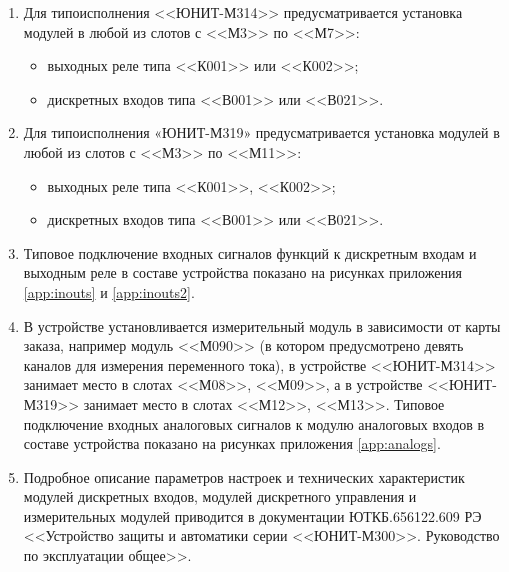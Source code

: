 \documentclass[a4paper, 12pt,table, hidelinks, DIV=calc]{extarticle} %
\begin{document}
\begin{enumerate}[label=\arabic{section}.\arabic{subsection}.\arabic*, labelsep=4pt, leftmargin=0pt, itemindent=57pt]
\item
Для типоисполнения <<ЮНИТ-М314>> предусматривается установка модулей в любой из слотов с <<М3>> по <<М7>>:
\begin{itemize}
    \item выходных реле типа <<К001>> или <<К002>>;
    \item дискретных входов типа <<В001>> или <<В021>>.
\end{itemize}
\item
Для типоисполнения «ЮНИТ-М319» предусматривается установка модулей в любой из слотов с <<М3>> по <<М11>>:
\begin{itemize}
    \item выходных реле типа <<К001>>, <<К002>>;
    \item дискретных входов типа <<В001>> или <<В021>>.
\end{itemize}
\item
Типовое подключение входных сигналов функций к дискретным входам и выходным реле в составе устройства показано на рисунках приложения \ref{app:inouts} и \ref{app:inouts2}. 

\item
В устройстве установливается измерительный модуль в зависимости от карты заказа, например модуль <<М090>> (в котором предусмотрено девять каналов для измерения переменного тока), в устройстве <<ЮНИТ-М314>> занимает место в слотах <<М08>>, <<М09>>, а в устройстве <<ЮНИТ-М319>> занимает место в слотах <<М12>>, <<М13>>. Типовое подключение входных аналоговых сигналов к модулю аналоговых входов в составе устройства показано на рисунках приложения \ref{app:analogs}.

\item
Подробное описание параметров настроек и технических характеристик модулей дискретных входов, модулей дискретного управления и измерительных модулей приводится в документации ЮТКБ.656122.609 РЭ <<Устройство защиты и автоматики серии <<ЮНИТ-М300>>. Руководство по эксплуатации общее>>.


\end{enumerate}
\end{document}
